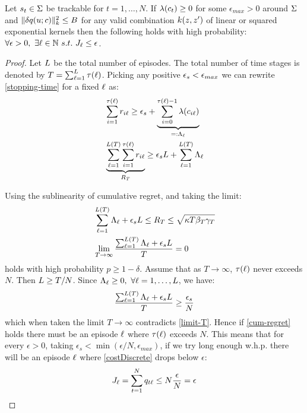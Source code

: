 \begin{theorem}\label{theorem1}
Let $s_t \in \Sigma$ be trackable for $t = 1, \ldots, N$. If $\lambda(c_t) \geq 0$ for some $\epsilon_{max} > 0$ around $\Sigma$ and $\|\delta q(u; c)\|_{k}^{2} \leq B$ for any valid combination $k(z,z')$ of linear or squared exponential kernels then the following holds with high probability: $\forall \epsilon > 0, \ \exists \episode \in \mathbb{N} \ s.t. \ \ValueFunction_{\episode} \leq \epsilon$.
\end{theorem}
\begin{proof}
Let $L$ be the total number of episodes. The total number of time stages is denoted by $T = \sum_{\ell=1}^{L} \tau(\ell)$. Picking any positive $\epsilon_s < \epsilon_{max}$ we can rewrite \eqref{stopping-time} for a fixed $\ell$ as:
\begin{align}
&\sum_{i=1}^{\tau(\ell)} r_{i\ell} \geq \epsilon_s + \underbrace{\sum_{i=0}^{\tau(\ell)-1} \lambda(c_{i\ell})}_{=: \Lambda_\ell} \\
&\underbrace{\sum_{\ell=1}^{L(T)}\sum_{i=1}^{\tau(\ell)} r_{i\ell}}_{R_{T}} \geq \epsilon_s L + \sum_{\ell=1}^{L(T)}\Lambda_\ell
\end{align}

Using the sublinearity of cumulative regret, and taking the limit:
\begin{align}
&\sum_{\ell=1}^{L(T)}\Lambda_\ell + \epsilon_s L \leq R_{T} \leq \sqrt{\kappa T \beta_{T} \gamma_{T}} \label{pre-limit-T} \\
&\lim\limits_{T \to \infty} \frac{\sum_{\ell=1}^{L(T)}\Lambda_\ell + \epsilon_s L}{T} = 0 \label{limit-T}
\end{align}
holds with high probability $p \geq 1 - \delta$. Assume that as $T \to \infty$, $\tau(\ell)$ never exceeds $N$. Then $L \geq T/N$. Since $\Lambda_\ell \geq 0, \ \forall \ell = 1,\ldots,L$, we have:
\begin{align}
\frac{\sum_{\ell=1}^{L(T)}\Lambda_\ell + \epsilon_s L}{T} \geq \frac{\epsilon_s}{N}
\end{align}
which when taken the limit $T \to \infty$ contradicts \eqref{limit-T}. Hence if \eqref{cum-regret} holds there must be an episode $\ell$ where $\tau(\ell)$  exceeds $N$. This means that for every $\epsilon > 0$, taking $\epsilon_s < \min(\epsilon/N, \epsilon_{max})$, if we try long enough w.h.p. there will be an episode $\ell$ where \eqref{costDiscrete} drops below $\epsilon$:
\begin{align}
J_\ell = \sum_{t=1}^{N} q_{t\ell} \leq N\frac{\epsilon}{N} = \epsilon
\end{align}
\end{proof}

